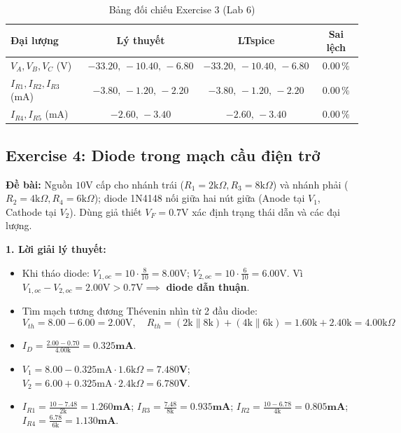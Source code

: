 \documentclass[11pt,a4paper]{article}
\begin{document}
\begin{table}[H]\centering\small
\caption{Bảng đối chiếu Exercise 3 (Lab 6)}
\begin{tabular}{|l|c|c|c|}
\hline
\textbf{Đại lượng} & \textbf{Lý thuyết} & \textbf{LTspice} & \textbf{Sai lệch} \\ \hline
$V_A, V_B, V_C$ (V) & $-33.20,\,-10.40,\,-6.80$ & $-33.20,\,-10.40,\,-6.80$ & $0.00\,\%$ \\ \hline
$I_{R1}, I_{R2}, I_{R3}$ (mA) & $-3.80,\,-1.20,\,-2.20$ & $-3.80,\,-1.20,\,-2.20$ & $0.00\,\%$ \\ \hline
$I_{R4}, I_{R5}$ (mA) & $-2.60,\,-3.40$ & $-2.60,\,-3.40$ & $0.00\,\%$ \\ \hline
\end{tabular}
\end{table}

\subsection{Exercise 4: Diode trong mạch cầu điện trở}
\textbf{Đề bài:} Nguồn $10\text{V}$ cấp cho nhánh trái ($R_1=2\text{k}\Omega, R_3=8\text{k}\Omega$) và nhánh phải ($R_2=4\text{k}\Omega, R_4=6\text{k}\Omega$); diode 1N4148 nối giữa hai nút giữa (Anode tại $V_1$, Cathode tại $V_2$). Dùng giả thiết $V_F=0.7\text{V}$ xác định trạng thái dẫn và các đại lượng.

\textbf{1. Lời giải lý thuyết:}
\begin{itemize}[itemsep=1pt]
  \item Khi tháo diode: $V_{1,oc} = 10\cdot\frac{8}{10} = 8.00\text{V}$; $V_{2,oc} = 10\cdot\frac{6}{10} = 6.00\text{V}$. Vì $V_{1,oc} - V_{2,oc} = 2.00\text{V} > 0.7\text{V} \implies$ \textbf{diode dẫn thuận}.
  \item Tìm mạch tương đương Thévenin nhìn từ 2 đầu diode:
  $$V_{th} = 8.00 - 6.00 = 2.00\text{V}, \quad R_{th} = (2\text{k}\parallel 8\text{k}) + (4\text{k}\parallel 6\text{k}) = 1.60\text{k} + 2.40\text{k} = 4.00\text{k}\Omega$$
  \item $I_D = \frac{2.00 - 0.70}{4.00\text{k}} = \mathbf{0.325\text{mA}}$.
  \item $V_1 = 8.00 - 0.325\text{mA}\cdot 1.6\text{k}\Omega = \mathbf{7.480\text{V}}$; $V_2 = 6.00 + 0.325\text{mA}\cdot 2.4\text{k}\Omega = \mathbf{6.780\text{V}}$.
  \item $I_{R1} = \frac{10 - 7.48}{2\text{k}} = \mathbf{1.260\text{mA}}$; $I_{R3} = \frac{7.48}{8\text{k}} = \mathbf{0.935\text{mA}}$; $I_{R2} = \frac{10 - 6.78}{4\text{k}} = \mathbf{0.805\text{mA}}$; $I_{R4} = \frac{6.78}{6\text{k}} = \mathbf{1.130\text{mA}}$.
\end{itemize}
\end{document}
